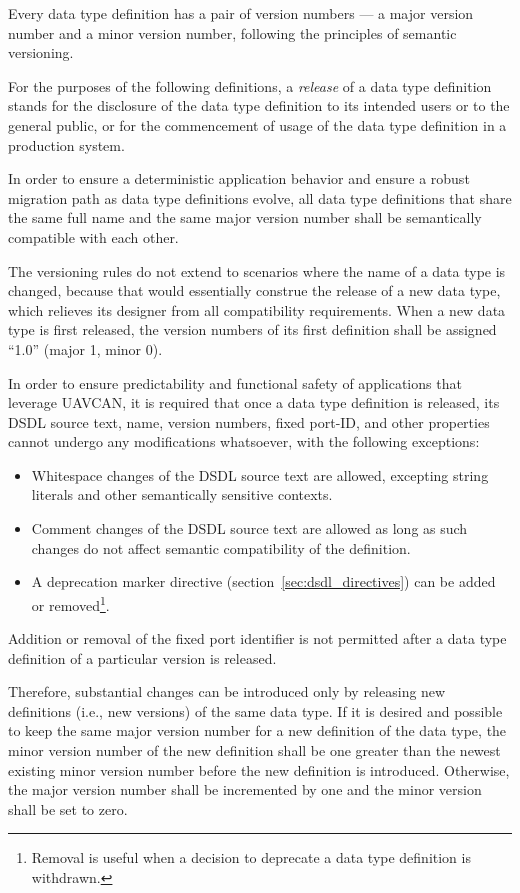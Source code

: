 Every data type definition has a pair of version numbers ---
a major version number and a minor version number, following the principles of semantic versioning.

For the purposes of the following definitions, a \emph{release} of a data type definition stands for
the disclosure of the data type definition to its intended users or to the general public,
or for the commencement of usage of the data type definition in a production system.

In order to ensure a deterministic application behavior and ensure a robust migration path
as data type definitions evolve, all data type definitions that share the same
full name and the same major version number shall be semantically compatible with each other.

The versioning rules do not extend to scenarios where the name of a data type is changed,
because that would essentially construe the release of a new data type,
which relieves its designer from all compatibility requirements.
When a new data type is first released,
the version numbers of its first definition shall be assigned ``1.0'' (major 1, minor 0).

In order to ensure predictability and functional safety of applications that leverage UAVCAN,
it is required that once a data type definition is released,
its DSDL source text, name, version numbers, fixed port-ID, and other properties cannot undergo any
modifications whatsoever, with the following exceptions:
\begin{itemize}
    \item Whitespace changes of the DSDL source text are allowed,
          excepting string literals and other semantically sensitive contexts.

    \item Comment changes of the DSDL source text are allowed as long as such changes
          do not affect semantic compatibility of the definition.

    \item A deprecation marker directive (section~\ref{sec:dsdl_directives}) can be added or removed\footnote{%
              Removal is useful when a decision to deprecate a data type definition is withdrawn.
          }.
\end{itemize}
Addition or removal of the fixed port identifier is not permitted after a data type definition
of a particular version is released.

Therefore, substantial changes can be introduced only by releasing new definitions (i.e., new versions)
of the same data type.
If it is desired and possible to keep the same major version number for a new definition of the data type,
the minor version number of the new definition shall be one greater than the newest existing minor version
number before the new definition is introduced.
Otherwise, the major version number shall be incremented by one and the minor version shall be set to zero.

